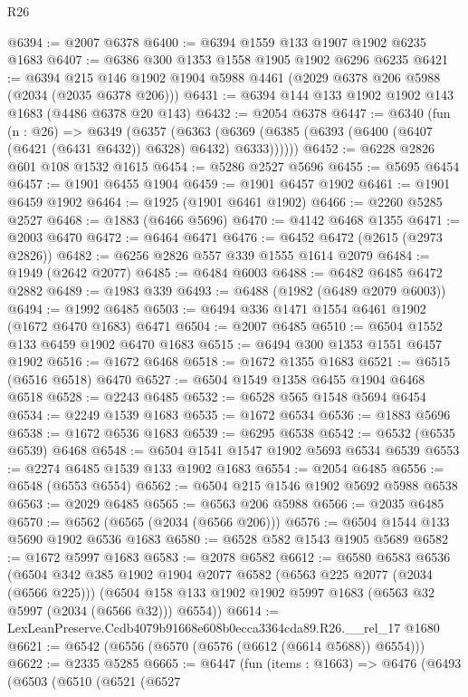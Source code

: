 \begin{lexlean}{R26}
\begin{coremodule}
@6394 := @2007 @6378
@6400 := @6394 @1559 @133 @1907 @1902 @6235 @1683
@6407 := @6386 @300 @1353 @1558 @1905 @1902 @6296 @6235
@6421 := @6394 @215 @146 @1902 @1904 @5988 @4461 (@2029 @6378 @206 @5988 (@2034 (@2035 @6378 @206)))
@6431 := @6394 @144 @133 @1902 @1902 @143 @1683 (@4486 @6378 @20 @143)
@6432 := @2054 @6378
@6447 := @6340
    (fun (n : @26) =>
    @6349
      (@6357
        (@6363 (@6369 (@6385 (@6393 (@6400 (@6407 (@6421 (@6431 @6432)) @6328) @6432) @6333))))))
@6452 := @6228 @2826 @601 @108 @1532 @1615
@6454 := @5286 @2527 @5696
@6455 := @5695 @6454
@6457 := @1901 @6455 @1904
@6459 := @1901 @6457 @1902
@6461 := @1901 @6459 @1902
@6464 := @1925 (@1901 @6461 @1902)
@6466 := @2260 @5285 @2527
@6468 := @1883 (@6466 @5696)
@6470 := @4142 @6468 @1355
@6471 := @2003 @6470
@6472 := @6464 @6471
@6476 := @6452 @6472 (@2615 (@2973 @2826))
@6482 := @6256 @2826 @557 @339 @1555 @1614 @2079
@6484 := @1949 (@2642 @2077)
@6485 := @6484 @6003
@6488 := @6482 @6485 @6472 @2882
@6489 := @1983 @339
@6493 := @6488 (@1982 (@6489 @2079 @6003))
@6494 := @1992 @6485
@6503 := @6494 @336 @1471 @1554 @6461 @1902 (@1672 @6470 @1683) @6471
@6504 := @2007 @6485
@6510 := @6504 @1552 @133 @6459 @1902 @6470 @1683
@6515 := @6494 @300 @1353 @1551 @6457 @1902
@6516 := @1672 @6468
@6518 := @1672 @1355 @1683
@6521 := @6515 (@6516 @6518) @6470
@6527 := @6504 @1549 @1358 @6455 @1904 @6468 @6518
@6528 := @2243 @6485
@6532 := @6528 @565 @1548 @5694 @6454
@6534 := @2249 @1539 @1683
@6535 := @1672 @6534
@6536 := @1883 @5696
@6538 := @1672 @6536 @1683
@6539 := @6295 @6538
@6542 := @6532 (@6535 @6539) @6468
@6548 := @6504 @1541 @1547 @1902 @5693 @6534 @6539
@6553 := @2274 @6485 @1539 @133 @1902 @1683
@6554 := @2054 @6485
@6556 := @6548 (@6553 @6554)
@6562 := @6504 @215 @1546 @1902 @5692 @5988 @6538
@6563 := @2029 @6485
@6565 := @6563 @206 @5988
@6566 := @2035 @6485
@6570 := @6562 (@6565 (@2034 (@6566 @206)))
@6576 := @6504 @1544 @133 @5690 @1902 @6536 @1683
@6580 := @6528 @582 @1543 @1905 @5689
@6582 := @1672 @5997 @1683
@6583 := @2078 @6582
@6612 := @6580
    @6583
    @6536
    (@6504
      @342
      @385
      @1902
      @1904
      @2077
      @6582
      (@6563 @225 @2077 (@2034 (@6566 @225)))
      (@6504 @158 @133 @1902 @1902 @5997 @1683 (@6563 @32 @5997 (@2034 (@6566 @32))) @6554))
@6614 := LexLeanPreserve.Ccdb4079b91668e608b0ecca3364cda89.R26.__rel_17 @1680
@6621 := @6542 (@6556 (@6570 (@6576 (@6612 (@6614 @5688)) @6554)))
@6622 := @2335 @5285
@6665 := @6447
    (fun (items : @1663) =>
    @6476
      (@6493
        (@6503
          (@6510
            (@6521
              (@6527

\end{coremodule}
\end{lexlean}
